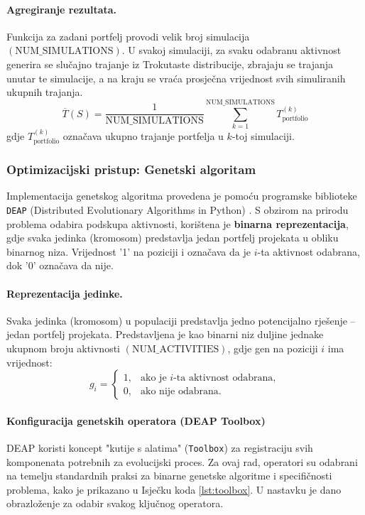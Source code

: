 \paragraph{Agregiranje rezultata.}
Funkcija za zadani portfelj provodi velik broj simulacija $(\text{NUM\_SIMULATIONS})$. U svakoj simulaciji, za svaku odabranu aktivnost generira se slučajno trajanje iz Trokutaste distribucije, zbrajaju se trajanja unutar te simulacije, a na kraju se vraća prosječna vrijednost svih simuliranih ukupnih trajanja.
\[
\overline{T}(S) = \frac{1}{\text{NUM\_SIMULATIONS}} \sum_{k=1}^{\text{NUM\_SIMULATIONS}} T_{\text{portfolio}}^{(k)}
\]
gdje $T_{\text{portfolio}}^{(k)}$ označava ukupno trajanje portfelja u $k$-toj simulaciji.


\subsubsection{Optimizacijski pristup: Genetski algoritam}

Implementacija genetskog algoritma provedena je pomoću programske biblioteke \texttt{DEAP} (Distributed Evolutionary Algorithms in Python) \cite{DEAP2012}. 
S obzirom na prirodu problema odabira podskupa aktivnosti, korištena je \textbf{binarna reprezentacija}, gdje svaka jedinka (kromosom) predstavlja jedan portfelj projekata u obliku binarnog niza. Vrijednost '1' na poziciji i označava da je $i$-ta aktivnost odabrana, dok '0' označava da nije.
\paragraph{Reprezentacija jedinke.}
Svaka jedinka (kromosom) u populaciji predstavlja jedno potencijalno rješenje – jedan portfelj projekata. 
Predstavljena je kao binarni niz duljine jednake ukupnom broju aktivnosti $(\text{NUM\_ACTIVITIES})$, gdje gen na poziciji $i$ ima vrijednost:
\[
g_i =
\begin{cases}
1, & \text{ako je $i$-ta aktivnost odabrana}, \\
0, & \text{ako nije odabrana}.
\end{cases}
\]
\paragraph{Konfiguracija genetskih operatora (DEAP Toolbox)}

DEAP koristi koncept "kutije s alatima" (\texttt{Toolbox}) za registraciju svih komponenata potrebnih za evolucijski proces. Za ovaj rad, operatori su odabrani na temelju standardnih praksi za binarne genetske algoritme i specifičnosti problema, kako je prikazano u Isječku koda \ref{lst:toolbox}. U nastavku je dano obrazloženje za odabir svakog ključnog operatora.

